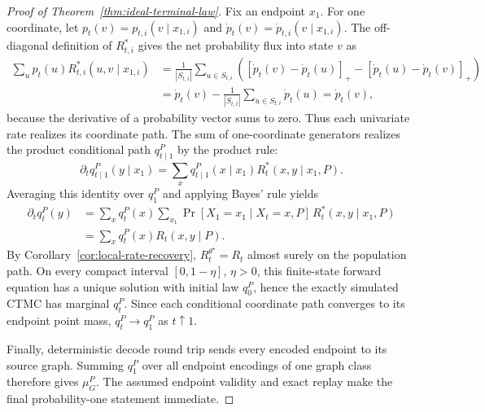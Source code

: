 \documentclass{article}
\begin{document}
\begin{proof}[Proof of Theorem~\ref{thm:ideal-terminal-law}]
Fix an endpoint $x_1$. For one coordinate, let $p_t(v)=p_{t,i}(v\mid x_{1,i})$
and $\dot p_t(v)=\dot p_{t,i}(v\mid x_{1,i})$. The off-diagonal definition of
$R^*_{t,i}$ gives the net probability flux into state $v$ as
\begin{align}
 \sum_u p_t(u)R^*_{t,i}(u,v\mid x_{1,i})
 &=
 \frac{1}{|S_{t,i}|}\sum_{u\in S_{t,i}}
 \left([\dot p_t(v)-\dot p_t(u)]_+
       -[\dot p_t(u)-\dot p_t(v)]_+\right)\\
 &=
 \dot p_t(v)-\frac{1}{|S_{t,i}|}
 \sum_{u\in S_{t,i}}\dot p_t(u)
 =\dot p_t(v),
\end{align}
because the derivative of a probability vector sums to zero. Thus each univariate rate realizes
its coordinate path. The sum of one-coordinate generators realizes the product conditional path
$q_{t\mid1}^P$ by the product rule:
\begin{equation}
 \partial_t q_{t\mid1}^P(y\mid x_1)
 =
 \sum_x q_{t\mid1}^P(x\mid x_1)R_t^*(x,y\mid x_1,P).
\end{equation}
Averaging this identity over $q_1^P$ and applying Bayes' rule yields
\begin{align}
 \partial_t q_t^P(y)
 &=
 \sum_x q_t^P(x)
 \sum_{x_1}
 \Pr[X_1=x_1\mid X_t=x,P]\,
 R_t^*(x,y\mid x_1,P)\\
 &=
 \sum_x q_t^P(x)R_t(x,y\mid P).
\end{align}
By Corollary~\ref{cor:local-rate-recovery}, $R_t^{\theta^\star}=R_t$ almost surely on the
population path. On every compact interval $[0,1-\eta]$, $\eta>0$, this finite-state forward
equation has a unique solution with initial law $q_0^P$, hence the exactly simulated CTMC has
marginal $q_t^P$. Since each conditional coordinate path converges to its endpoint point mass,
$q_t^P\to q_1^P$ as $t\uparrow1$.

Finally, deterministic decode round trip sends every encoded endpoint to its source graph.
Summing $q_1^P$ over all endpoint encodings of one graph class therefore gives $\mu_G^P$.
The assumed endpoint validity and exact replay make the final probability-one statement immediate.
\end{proof}
\end{document}
